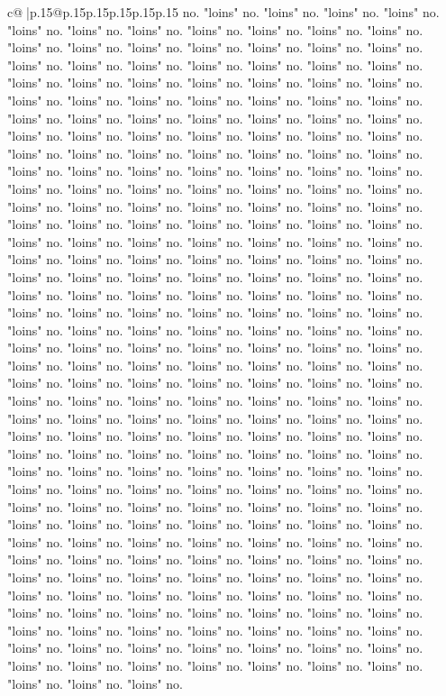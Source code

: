 \documentclass{article}
\begin{document}
{\begin{supertabular}{c@{$\;$}|p{.15\linewidth}@{}p{.15\linewidth}p{.15\linewidth}p{.15\linewidth}p{.15\linewidth}p{.15\linewidth}}
{{{no. "loins" no. "loins" no. "loins" no. "loins" no. "loins" no. "loins" no. "loins" no. "loins" no. "loins" no. "loins" no. "loins" no. "loins" no. "loins" no. "loins" no. "loins" no. "loins" no. "loins" no. "loins" no. "loins" no. "loins" no. "loins" no. "loins" no. "loins" no. "loins" no. "loins" no. "loins" no. "loins" no. "loins" no. "loins" no. "loins" no. "loins" no. "loins" no. "loins" no. "loins" no. "loins" no. "loins" no. "loins" no. "loins" no. "loins" no. "loins" no. "loins" no. "loins" no. "loins" no. "loins" no. "loins" no. "loins" no. "loins" no. "loins" no. "loins" no. "loins" no. "loins" no. "loins" no. "loins" no. "loins" no. "loins" no. "loins" no. "loins" no. "loins" no. "loins" no. "loins" no. "loins" no. "loins" no. "loins" no. "loins" no. "loins" no. "loins" no. "loins" no. "loins" no. "loins" no. "loins" no. "loins" no. "loins" no. "loins" no. "loins" no. "loins" no. "loins" no. "loins" no. "loins" no. "loins" no. "loins" no. "loins" no. "loins" no. "loins" no. "loins" no. "loins" no. "loins" no. "loins" no. "loins" no. "loins" no. "loins" no. "loins" no. "loins" no. "loins" no. "loins" no. "loins" no. "loins" no. "loins" no. "loins" no. "loins" no. "loins" no. "loins" no. "loins" no. "loins" no. "loins" no. "loins" no. "loins" no. "loins" no. "loins" no. "loins" no. "loins" no. "loins" no. "loins" no. "loins" no. "loins" no. "loins" no. "loins" no. "loins" no. "loins" no. "loins" no. "loins" no. "loins" no. "loins" no. "loins" no. "loins" no. "loins" no. "loins" no. "loins" no. "loins" no. "loins" no. "loins" no. "loins" no. "loins" no. "loins" no. "loins" no. "loins" no. "loins" no. "loins" no. "loins" no. "loins" no. "loins" no. "loins" no. "loins" no. "loins" no. "loins" no. "loins" no. "loins" no. "loins" no. "loins" no. "loins" no. "loins" no. "loins" no. "loins" no. "loins" no. "loins" no. "loins" no. "loins" no. "loins" no. "loins" no. "loins" no. "loins" no. "loins" no. "loins" no. "loins" no. "loins" no. "loins" no. "loins" no. "loins" no. "loins" no. "loins" no. "loins" no. "loins" no. "loins" no. "loins" no. "loins" no. "loins" no. "loins" no. "loins" no. "loins" no. "loins" no. "loins" no. "loins" no. "loins" no. "loins" no. "loins" no. "loins" no. "loins" no. "loins" no. "loins" no. "loins" no. "loins" no. "loins" no. "loins" no. "loins" no. "loins" no. "loins" no. "loins" no. "loins" no. "loins" no. "loins" no. "loins" no. "loins" no. "loins" no. "loins" no. "loins" no. "loins" no. "loins" no. "loins" no. "loins" no. "loins" no. "loins" no. "loins" no. "loins" no. "loins" no. "loins" no. "loins" no. "loins" no. "loins" no. "loins" no. "loins" no. "loins" no. "loins" no. "loins" no. "loins" no. "loins" no. "loins" no. "loins" no. "loins" no. "loins" no. "loins" no. "loins" no. "loins" no. "loins" no. "loins" no. "loins" no. "loins" no. "loins" no. "loins" no. "loins" no. "loins" no. "loins" no. "loins" no. "loins" no. "loins" no. "loins" no. "loins" no. "loins" no. "loins" no. "loins" no. "loins" no. "loins" no. "loins" no. "loins" no. "loins" no. "loins" no. "loins" no. "loins" no. "loins" no. "loins" no. "loins" no. "loins" no. "loins" no. "loins" no. "loins" no. "loins" no. "loins" no. "loins" no. }}}
\end{supertabular}}
\end{document}
